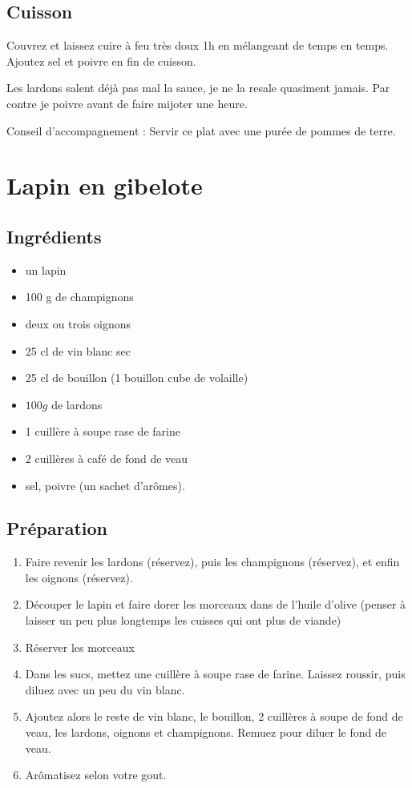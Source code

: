 \subsection*{Cuisson}
Couvrez et laissez cuire à feu très doux 1h en mélangeant de temps en temps. Ajoutez sel et poivre en fin de cuisson.
\begin{remarque}
Les lardons salent déjà pas mal la sauce, je ne la resale quasiment jamais. Par contre je poivre avant de faire mijoter une heure.
\end{remarque}

Conseil d'accompagnement : Servir ce plat avec une purée de pommes de terre.

\newpage
\section{Lapin en gibelote}
\subsection*{Ingrédients}
\begin{itemize}
\item un lapin
\item 100 g de champignons
\item deux ou trois oignons
\item 25 cl de vin blanc sec
\item 25 cl de bouillon (1 bouillon cube de volaille)
\item $100\unit{g}$ de lardons
\item 1 cuillère à soupe rase de farine
\item 2 cuillères à café de fond de veau
\item sel, poivre (un sachet d'arômes).
\end{itemize}

\subsection*{Préparation}
\begin{enumerate}
\item Faire revenir les lardons (réservez), puis les champignons (réservez), et enfin les oignons (réservez).
\item Découper le lapin et faire dorer les morceaux dans de l'huile d'olive (penser à laisser un peu plus longtemps les cuisses qui ont plus de viande)
\item Réserver les morceaux
\item Dans les sucs, mettez une cuillère à soupe rase de farine. Laissez roussir, puis diluez avec un peu du vin blanc.
\item Ajoutez alors le reste de vin blanc, le bouillon, 2 cuillères à soupe de fond de veau, les lardons, oignons et champignons. Remuez pour diluer le fond de veau.
\item Arômatisez selon votre gout.
\end{enumerate}


